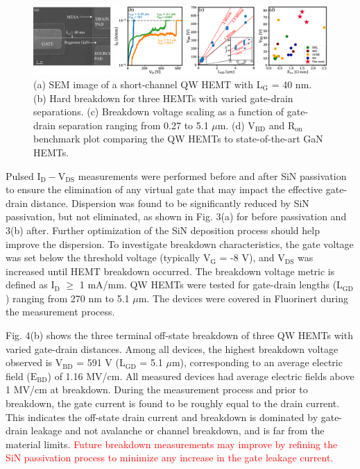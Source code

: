 \documentclass[journal]{IEEEtran}
\begin{document}
\begin{figure}[!t]
\centering
\includegraphics[width=\textwidth]{Figure4_bigger_inset.eps}
\caption{ (a) SEM image of a short-channel QW HEMT with $\mathrm{L_G}$ = 40 nm. (b) Hard breakdown for three HEMTs with varied gate-drain separations. (c) Breakdown voltage scaling as a function of gate-drain separation ranging from 0.27 to 5.1 $\mu$m. (d) $\mathrm{V_{BD}}$ and $\mathrm{R_{on}}$ benchmark plot comparing the QW HEMTs to state-of-the-art GaN HEMTs. }
\label{fig:benchmark}
\end{figure}


Pulsed $\mathrm{I_D-V_{DS}}$ measurements were performed before and after SiN passivation to ensure the elimination of any virtual gate that may impact the effective gate-drain distance. Dispersion was found to be significantly reduced by SiN passivation, but not eliminated, as shown in Fig. 3(a) for before passivation and 3(b) after. Further optimization of the SiN deposition process should help improve the dispersion. To investigate breakdown characteristics, the gate voltage was set below the threshold voltage (typically $\mathrm{V_G}$ = -8 V), and $\mathrm{V_{DS}}$ was increased until HEMT breakdown occurred. The breakdown voltage metric is defined as $\mathrm{I_D}$ $\geq$ 1 mA/mm. QW HEMTs were tested for gate-drain lengths ($\mathrm{L_{GD}}$) ranging from 270 nm to 5.1 $\mu$m. The devices were covered in Fluorinert during the measurement process.

Fig. 4(b) shows the three terminal off-state breakdown of three QW HEMTs with varied gate-drain distances. Among all devices, the highest breakdown voltage observed is $\mathrm{V_{BD}}$ = 591 V ($\mathrm{L_{GD}}$ = 5.1 $\mu$m), corresponding to an average electric field ($\mathrm{E_{BD}}$) of 1.16 MV/cm. All measured devices had average electric fields above 1 MV/cm at breakdown. During the measurement process and prior to breakdown, the gate current is found to be roughly equal to the drain current. This indicates the off-state drain current and breakdown is dominated by gate-drain leakage and not avalanche or channel breakdown, and is far from the material limits. 
\textcolor{red}{Future breakdown measurements may improve by refining the SiN passivation process to minimize any increase in the gate leakage current.}
\end{document}
